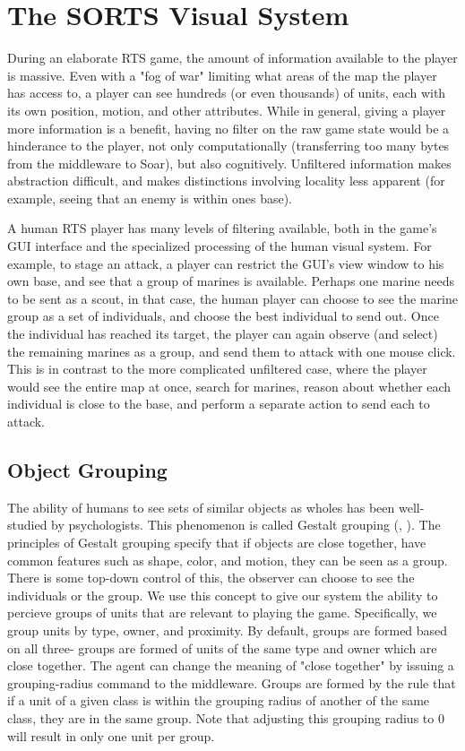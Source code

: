 \section{The SORTS Visual System}

During an elaborate RTS game, the amount of information available to the player is massive. Even with a "fog of war" limiting what areas of the map the player has access to, a player can see hundreds (or even thousands) of units, each with its own position, motion, and other attributes. While in general, giving a player more information is a benefit, having no filter on the raw game state would be a hinderance to the player, not only computationally (transferring too many bytes from the middleware to Soar), but also cognitively. Unfiltered information makes abstraction difficult, and makes distinctions involving locality less apparent (for example, seeing that an enemy is within ones base).

A human RTS player has many levels of filtering available, both in the game's GUI interface and the specialized processing of the human visual system. For example, to stage an attack, a player can restrict the GUI's view window to his own base, and see that a group of marines is available. Perhaps one marine needs to be sent as a scout, in that case, the human player can choose to see the marine group as a set of individuals, and choose the best individual to send out. Once the individual has reached its target, the player can again observe (and select) the remaining marines as a group, and send them to attack with one mouse click. This is in contrast to the more complicated unfiltered case, where the player would see the entire map at once, search for marines, reason about whether each individual is close to the base, and perform a separate action to send each to attack.

\subsection{Object Grouping}

The ability of humans to see sets of similar objects as wholes has been well-studied by psychologists. This phenomenon is called Gestalt grouping (\cite{hill99modeling}, \cite{Kubovy1998}). The principles of Gestalt grouping specify that if objects are close together, have common features such as shape, color, and motion, they can be seen as a group. There is some top-down control of this, the observer can choose to see the individuals or the group. We use this concept to give our system the ability to percieve groups of units that are relevant to playing the game. Specifically, we group units by type, owner, and proximity. By default, groups are formed based on all three- groups are formed of units of the same type and owner which are close together. The agent can change the meaning of "close together" by issuing a grouping-radius command to the middleware. Groups are formed by the rule that if a unit of a given class is within the grouping radius of another of the same class, they are in the same group. Note that adjusting this grouping radius to 0 will result in only one unit per group.

